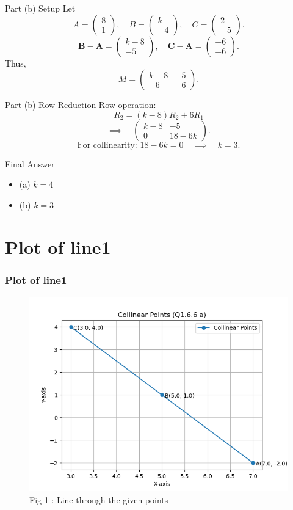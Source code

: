 \documentclass{beamer}
\theoremstyle{remark}
\newcommand{\myvec}[1]{\ensuremath{\begin{pmatrix}#1\end{pmatrix}}}
\let\vec\mathbf
\numberwithin{equation}{section}
\begin{document}
\begin{frame}{Part (b) Setup}
Let
\[
A=\myvec{8\\1}, \quad B=\myvec{k\\-4}, \quad C=\myvec{2\\-5}.
\]
\[
\vec{B}-\vec{A} = \myvec{k-8\\ -5}, \quad
\vec{C}-\vec{A} = \myvec{-6\\ -6}.
\]
Thus,
\[
M = \myvec{k-8 & -5\\ -6 & -6}.
\]
\end{frame}

\begin{frame}{Part (b) Row Reduction}
Row operation:
\[
R_2 = (k-8)R_2 + 6R_1
\]
\[
\implies \quad \myvec{k-8 & -5\\ 0 & 18-6k}.
\]
\[
\text{For collinearity: } 18-6k=0 \quad \implies \quad k=\boxed{3}.
\]
\end{frame}

\begin{frame}{Final Answer}
\begin{itemize}
\item (a) $k=4$
\item (b) $k=3$
\end{itemize}
\end{frame}


\section{Plot of line1}

\begin{frame}
\frametitle{Plot of line1}

\begin{figure}[h!]
  \centering
  \includegraphics[width=0.5\columnwidth]{figs/fig_a.png} 
   \caption*{Fig 1 : Line through the given points}
  \label{Fig1}
\end{figure}

\end{frame}
\end{document}
